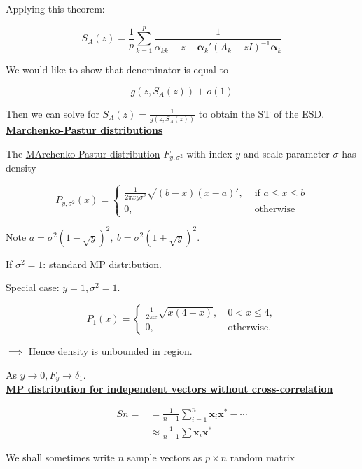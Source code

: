 \documentclass[twoside]{article}
\begin{document}
Applying this theorem:

\begin{equation}
	S_A(z)=\frac{1}{p}\sum^p_{k=1}\frac{1}{\alpha_{kk}-z-\mathbf{\alpha}_k'(A_k-zI)^{-1}\mathbf{\alpha}_k}
\end{equation}

We would like to show that denominator is equal to

$$g(z, S_A(z))+ o(1)$$

Then we can solve for $S_A(z)=\frac{1}{g(z, S_A(z))}$ to obtain the ST of the ESD.\\

\underline{\textbf{Marchenko-Pastur distributions}}

The \underline{MArchenko-Pastur distribution} $F_{y,\sigma^2}$ with index $y$ and scale parameter $\sigma$ has density

$$P_{y,\sigma^2}(x)=\begin{cases}
	\frac{1}{2\pi xy\sigma^2}\sqrt{(b-x)(x-a)'},&\text{ if } a\leq x\leq b\\
	0,&\text{ otherwise }
\end{cases}$$

Note $a=\sigma^2(1-\sqrt{y})^2,\ b=\sigma^2(1+\sqrt{y})^2$.

If $\sigma^2=1$: \underline{standard MP distribution.}

Special case: $y=1, \sigma^2=1$.

$$P_1(x)=\begin{cases}
	\frac{1}{2\pi x}\sqrt{x(4-x)},&\ 0<x\leq 4,\\
	0,&\ \text{otherwise}.
\end{cases}$$

$\implies$ Hence density is unbounded in region.

As $y\to 0, F_y\to \delta_1$.\\

\underline{\textbf{MP distribution for independent vectors without cross-correlation}}

\begin{equation}
	\begin{split}
		Sn=&=\frac{1}{n-1}\sum^n_{i=1}\mathbf{x}_i\mathbf{x}^*-\cdots\\
		&\approx\frac{1}{n-1}\sum\mathbf{x}_i\mathbf{x}^*
	\end{split}
\end{equation}

We shall sometimes write $n$ sample vectors as $p\times n$ random matrix
\end{document}

